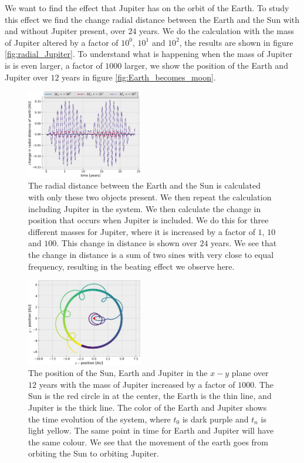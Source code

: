 \documentclass[%
 reprint,
nofootinbib,
aps,
]{revtex4-1}
\begin{document}
We want to find the effect that Jupiter has on the orbit of the Earth. To study this effect we find the change radial distance between the Earth and the Sun with and without Jupiter present, over $24$ years. We do the calculation with the mass of Jupiter altered by a factor of $10^{0}$, $10^{1}$ and $10^{2}$, the results are shown in figure \vref{fig:radial_Jupiter}. To understand what is happening when the mass of Jupiter is is even larger, a factor of $1000$ larger, we show the position of the Earth and Jupiter over $12$ years in figure \vref{fig:Earth_becomes_moon}.

\begin{figure}
  \centering
  \includegraphics[width=0.45\textwidth]{../figures/radial_distance_jupiter.pdf}
  \caption{The radial distance between the Earth and the Sun is calculated with only these two objects present. We then repeat the calculation including Jupiter in the system. We then calculate the change in position that occurs when Jupiter is included. We do this for three different masses for Jupiter, where it is increased by a factor of $1$, $10$ and $100$. This change in distance is shown over $24$ years. We see that the change in distance is a sum of two sines with very close to equal frequency, resulting in the beating effect we observe here.}
  \label{fig:radial_Jupiter}
\end{figure}

\begin{figure}
  \centering
  \includegraphics[width=0.45\textwidth]{../figures/jupiter_1000_mass.pdf}
  \caption{The position of the Sun, Earth and Jupiter in the $x-y$ plane over $12$ years with the mass of Jupiter increased by a factor of $1000$. The Sun is the red circle in at the center, the Earth is the thin line, and Jupiter is the thick line. The color of the Earth and Jupiter shows the time evolution of the system, where $t_0$ is dark purple and $t_n$ is light yellow. The same point in time for Earth and Jupiter will have the same colour. We see that the movement of the earth goes from orbiting the Sun to orbiting Jupiter.}
  \label{fig:Earth_becomes_moon}
\end{figure}
\end{document}
